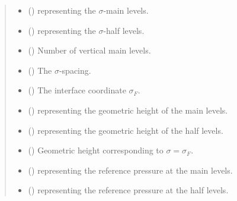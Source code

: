\documentclass[letterpaper,10pt,english]{sphinxmanual}
\begin{document}
\begin{fulllineitems}
\begin{quote}
\begin{description}
\begin{itemize}
\item {} 
 () \textendash{} {\hyperref[\detokenize{api:tasmania.grids.axis.Axis}]{}} representing the \(\sigma\)-main levels.

\item {} 
 () \textendash{} {\hyperref[\detokenize{api:tasmania.grids.axis.Axis}]{}} representing the \(\sigma\)-half levels.

\item {} 
 () \textendash{} Number of vertical main levels.

\item {} 
 () \textendash{} The \(\sigma\)-spacing.

\item {} 
 () \textendash{} The interface coordinate \(\sigma_F\).

\item {} 
 () \textendash{}  representing the geometric height of the main levels.

\item {} 
 () \textendash{}  representing the geometric height of the half levels.

\item {} 
 () \textendash{} Geometric height corresponding to \(\sigma = \sigma_F\).

\item {} 
 () \textendash{}  representing the reference pressure at the main levels.

\item {} 
 () \textendash{}  representing the reference pressure at the half levels.


\end{itemize}
\end{description}
\end{quote}
\end{fulllineitems}
\end{document}
